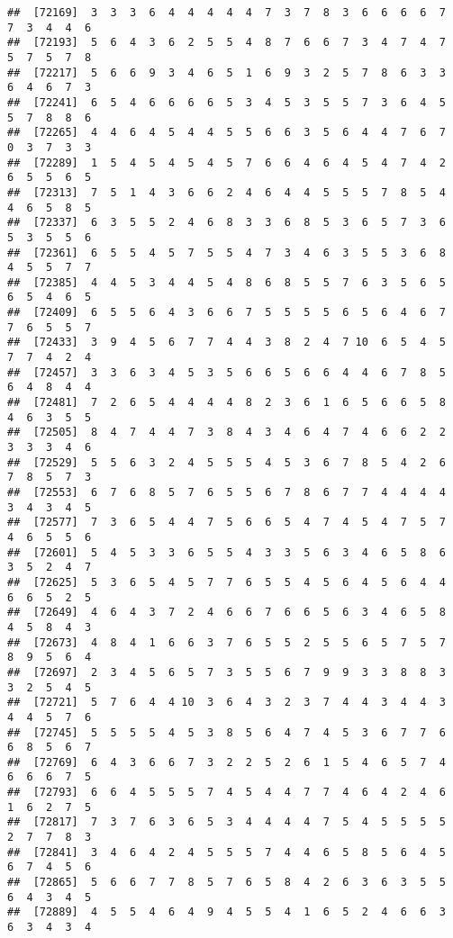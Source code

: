 \documentclass[
]{book}
\begin{document}
\begin{verbatim}
##  [72169]  3  3  3  6  4  4  4  4  4  7  3  7  8  3  6  6  6  6  7  7  3  4  4  6
##  [72193]  5  6  4  3  6  2  5  5  4  8  7  6  6  7  3  4  7  4  7  5  7  5  7  8
##  [72217]  5  6  6  9  3  4  6  5  1  6  9  3  2  5  7  8  6  3  3  6  4  6  7  3
##  [72241]  6  5  4  6  6  6  6  5  3  4  5  3  5  5  7  3  6  4  5  5  7  8  8  6
##  [72265]  4  4  6  4  5  4  4  5  5  6  6  3  5  6  4  4  7  6  7  0  3  7  3  3
##  [72289]  1  5  4  5  4  5  4  5  7  6  6  4  6  4  5  4  7  4  2  6  5  5  6  5
##  [72313]  7  5  1  4  3  6  6  2  4  6  4  4  5  5  5  7  8  5  4  4  6  5  8  5
##  [72337]  6  3  5  5  2  4  6  8  3  3  6  8  5  3  6  5  7  3  6  5  3  5  5  6
##  [72361]  6  5  5  4  5  7  5  5  4  7  3  4  6  3  5  5  3  6  8  4  5  5  7  7
##  [72385]  4  4  5  3  4  4  5  4  8  6  8  5  5  7  6  3  5  6  5  6  5  4  6  5
##  [72409]  6  5  5  6  4  3  6  6  7  5  5  5  5  6  5  6  4  6  7  7  6  5  5  7
##  [72433]  3  9  4  5  6  7  7  4  4  3  8  2  4  7 10  6  5  4  5  7  7  4  2  4
##  [72457]  3  3  6  3  4  5  3  5  6  6  5  6  6  4  4  6  7  8  5  6  4  8  4  4
##  [72481]  7  2  6  5  4  4  4  4  8  2  3  6  1  6  5  6  6  5  8  4  6  3  5  5
##  [72505]  8  4  7  4  4  7  3  8  4  3  4  6  4  7  4  6  6  2  2  3  3  3  4  6
##  [72529]  5  5  6  3  2  4  5  5  5  4  5  3  6  7  8  5  4  2  6  7  8  5  7  3
##  [72553]  6  7  6  8  5  7  6  5  5  6  7  8  6  7  7  4  4  4  4  3  4  3  4  5
##  [72577]  7  3  6  5  4  4  7  5  6  6  5  4  7  4  5  4  7  5  7  4  6  5  5  6
##  [72601]  5  4  5  3  3  6  5  5  4  3  3  5  6  3  4  6  5  8  6  3  5  2  4  7
##  [72625]  5  3  6  5  4  5  7  7  6  5  5  4  5  6  4  5  6  4  4  6  6  5  2  5
##  [72649]  4  6  4  3  7  2  4  6  6  7  6  6  5  6  3  4  6  5  8  4  5  8  4  3
##  [72673]  4  8  4  1  6  6  3  7  6  5  5  2  5  5  6  5  7  5  7  8  9  5  6  4
##  [72697]  2  3  4  5  6  5  7  3  5  5  6  7  9  9  3  3  8  8  3  3  2  5  4  5
##  [72721]  5  7  6  4  4 10  3  6  4  3  2  3  7  4  4  3  4  4  3  4  4  5  7  6
##  [72745]  5  5  5  5  4  5  3  8  5  6  4  7  4  5  3  6  7  7  6  6  8  5  6  7
##  [72769]  6  4  3  6  6  7  3  2  2  5  2  6  1  5  4  6  5  7  4  6  6  6  7  5
##  [72793]  6  6  4  5  5  5  7  4  5  4  4  7  7  4  6  4  2  4  6  1  6  2  7  5
##  [72817]  7  3  7  6  3  6  5  3  4  4  4  4  7  5  4  5  5  5  5  2  7  7  8  3
##  [72841]  3  4  6  4  2  4  5  5  5  7  4  4  6  5  8  5  6  4  5  6  7  4  5  6
##  [72865]  5  6  6  7  7  8  5  7  6  5  8  4  2  6  3  6  3  5  5  6  4  3  4  5
##  [72889]  4  5  5  4  6  4  9  4  5  5  4  1  6  5  2  4  6  6  3  6  3  4  3  4

\end{verbatim}
\end{document}
